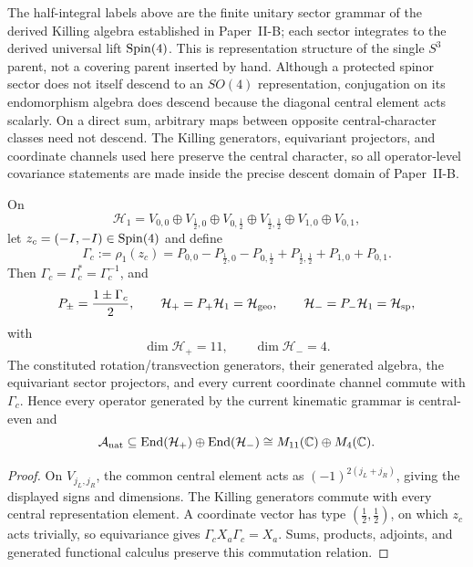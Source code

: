 \documentclass[12pt,a4paper]{article}
\begin{document}
\begin{remark}
\label{p2:rem:sector-grammar-sync}
The half-integral labels above are the finite unitary sector grammar of the
derived Killing algebra established in Paper~II-B; each sector integrates to
the derived universal lift \(\mathrm{Spin}(4)\).  This is representation structure of
the single \(S^3\) parent, not a covering parent inserted by hand.  Although
a protected spinor sector does not itself descend to an \(SO(4)\)
representation, conjugation on its endomorphism algebra does descend because
the diagonal central element acts scalarly.  On a direct sum, arbitrary maps
between opposite central-character classes need not descend.  The Killing
generators, equivariant projectors, and coordinate channels used here preserve
the central character, so all operator-level covariance statements are made
inside the precise descent domain of Paper~II-B.
\end{remark}

\begin{theorem}
\label{p2:thm:diagonal-center-grading}
On
\[
 \mathcal H_1=
 V_{0,0}\oplus V_{\frac12,0}\oplus V_{0,\frac12}
 \oplus V_{\frac12,\frac12}\oplus V_{1,0}\oplus V_{0,1},
\]
let \(z_c=(-I,-I)\in\mathrm{Spin}(4)\) and define
\[
 \Gamma_c:=\rho_1(z_c)
 =P_{0,0}-P_{\frac12,0}-P_{0,\frac12}
  +P_{\frac12,\frac12}+P_{1,0}+P_{0,1}.
\]
Then \(\Gamma_c=\Gamma_c^*=\Gamma_c^{-1}\), and
\[
 P_\pm=\frac{1\pm\Gamma_c}{2},
 \qquad
 \mathcal H_+=P_+\mathcal H_1=\mathcal H_{\rm geo},
 \qquad
 \mathcal H_-=P_-\mathcal H_1=\mathcal H_{\rm sp},
\]
with
\[
 \boxed{\dim\mathcal H_+=11,\qquad\dim\mathcal H_-=4.}
\]
The constituted rotation/transvection generators, their generated algebra,
the equivariant sector projectors, and every current coordinate channel
commute with \(\Gamma_c\).  Hence every operator generated by the current
kinematic grammar is central-even and
\[
 \mathcal A_{\rm nat}
 \subseteq
 \operatorname{End}(\mathcal H_+)\oplus\operatorname{End}(\mathcal H_-)
 \cong M_{11}(\mathbb{C})\oplus M_4(\mathbb{C}).
\]
\end{theorem}

\begin{proof}
On \(V_{j_L,j_R}\), the common central element acts as
\((-1)^{2(j_L+j_R)}\), giving the displayed signs and dimensions.  The
Killing generators commute with every central representation element.  A
coordinate vector has type \((\tfrac12,\tfrac12)\), on which \(z_c\) acts
trivially, so equivariance gives
\(\Gamma_cX_a\Gamma_c=X_a\).  Sums, products, adjoints, and generated
functional calculus preserve this commutation relation.
\end{proof}
\end{document}
